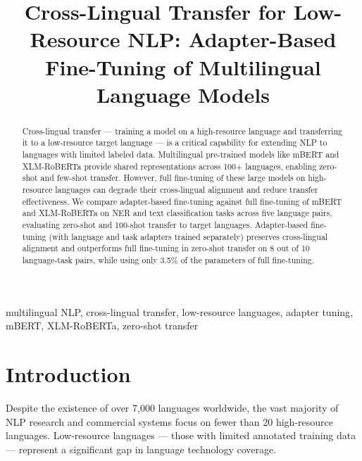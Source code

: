 \documentclass[conference]{IEEEtran}
\begin{document}
\title{Cross-Lingual Transfer for Low-Resource NLP: Adapter-Based Fine-Tuning of Multilingual Language Models}

\author{
}

\maketitle

\begin{abstract}
Cross-lingual transfer — training a model on a high-resource language and transferring it to a low-resource target language — is a critical capability for extending NLP to languages with limited labeled data. Multilingual pre-trained models like mBERT and XLM-RoBERTa provide shared representations across 100+ languages, enabling zero-shot and few-shot transfer. However, full fine-tuning of these large models on high-resource languages can degrade their cross-lingual alignment and reduce transfer effectiveness. We compare adapter-based fine-tuning against full fine-tuning of mBERT and XLM-RoBERTa on NER and text classification tasks across five language pairs, evaluating zero-shot and 100-shot transfer to target languages. Adapter-based fine-tuning (with language and task adapters trained separately) preserves cross-lingual alignment and outperforms full fine-tuning in zero-shot transfer on 8 out of 10 language-task pairs, while using only 3.5\% of the parameters of full fine-tuning.
\end{abstract}

\begin{IEEEkeywords}
multilingual NLP, cross-lingual transfer, low-resource languages, adapter tuning, mBERT, XLM-RoBERTa, zero-shot transfer
\end{IEEEkeywords}

\section{Introduction}

Despite the existence of over 7,000 languages worldwide, the vast majority of NLP research and commercial systems focus on fewer than 20 high-resource languages. Low-resource languages — those with limited annotated training data — represent a significant gap in language technology coverage.
\end{document}
